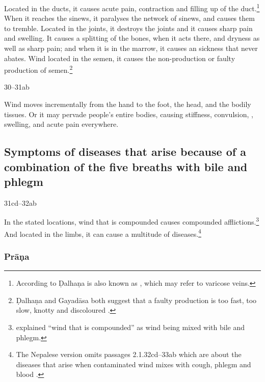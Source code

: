 \begin{translation}
Located in the ducts, it causes acute pain, contraction and filling up
of the duct.\footnote{According to Ḍalhaṇa  is also
    known as  \citep[262]{vulgate}, which may refer to
    varicose veins.} %
    When it reaches the sinews, it paralyses the network of sinews,
    and causes them to tremble.\label{ākṣepaka} %
    Located in the joints, it destroys the joints and it causes sharp
    pain and swelling. %
    It causes a splitting of the bones, when it acts there, and
    dryness as well as sharp pain; %
    and when it is in the marrow, it causes an sickness that never
    abates. %
    Wind located  in the semen, it  causes the non-production or faulty
    production of semen.\footnote{Ḍalhaṇa and Gayadāsa both suggest that
        a faulty production  is too fast, too
        slow, knotty and discoloured \cite[262]{vulgate}.}


\item[30--31ab]

Wind moves incrementally from the hand to the foot, the head, and the
bodily tissues.  Or it may pervade people's entire bodies, causing
stiffness, convulsion, , swelling, and acute pain
everywhere.



\subsection{Symptoms of diseases that arise because of a 
combination of the five breaths with bile and phlegm}

\item[31cd--32ab]

In the stated locations, wind that is compounded causes compounded
afflictions.\footnote{ explained “wind that is
    compounded” as wind being mixed with bile and phlegm.}  And located in
    the limbs, it can cause a multitude of diseases.\footnote{The Nepalese
        version omits passages 2.1.32cd--33ab which are about the diseases that
        arise when 	contaminated wind mixes with cough, phlegm and blood
        \citep[263]{vulgate}.}


\subsubsection{Prāṇa}


\end{translation}
